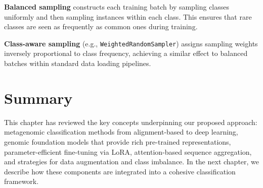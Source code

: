 \textbf{Balanced sampling} constructs each training batch by sampling classes uniformly and then sampling instances within each class. This ensures that rare classes are seen as frequently as common ones during training.

\textbf{Class-aware sampling} (e.g., \texttt{WeightedRandomSampler}) assigns sampling weights inversely proportional to class frequency, achieving a similar effect to balanced batches within standard data loading pipelines.

\section{Summary}

This chapter has reviewed the key concepts underpinning our proposed approach: metagenomic classification methods from alignment-based to deep learning, genomic foundation models that provide rich pre-trained representations, parameter-efficient fine-tuning via LoRA, attention-based sequence aggregation, and strategies for data augmentation and class imbalance. In the next chapter, we describe how these components are integrated into a cohesive classification framework.

